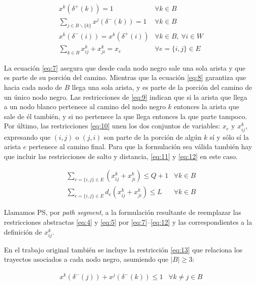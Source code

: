 \documentclass[10pt, a4paper]{article}
\theoremstyle{definition}
\begin{document}
\begin{align} 
	& x^{k}\left(\delta^{+}(k)\right)=1 & \forall k \in B \label{eq:7} \\
	& \sum_{j \in B \backslash\{k\}} x^{j}\left(\delta^{-}(k)\right)=1 & \forall k \in B \label{eq:8} \\
	& x^{k}\left(\delta^{-}(i)\right)=x^{k}\left(\delta^{+}(i)\right) & \forall k \in B,\ \forall i \in W \label{eq:9} \\
	& \sum_{k \in B} x_{i j}^{k}+x_{j i}^{k}=x_{e} & \forall e=\{i, j\} \in E \label{eq:10}
\end{align}

La ecuación \ref{eq:7} asegura que desde cada nodo negro sale una sola arista y que es parte de su porción del camino. Mientras que la ecuación \ref{eq:8} garantiza que hacia cada nodo de $B$ llega una sola arista, y es parte de la porción del camino de un único nodo negro. Las restricciones de \ref{eq:9} indican que si la arista que llega a un nodo blanco pertenece al camino del nodo negro $k$ entonces la arista que sale de él también, y si no pertenece la que llega entonces la que parte tampoco. Por último, las restricciones \ref{eq:10} unen los dos conjuntos de variables: $x_{e}$ y $x_{i j}^{k}$, expresando que $(i,j)$ o $(j,i)$ son parte de la porción de algún $k$ sí y sólo sí la arista $e$ pertenece al camino final. Para que la formulación sea válida también hay que incluir las restricciones de salto y distancia, \ref{eq:11} y \ref{eq:12} en este caso.

\begin{align} 
	& \sum_{e=\{i, j\} \in E}\left(x_{i j}^{k}+x_{j i}^{k}\right) \leq Q+1 & \forall k \in B \label{eq:11} \\
	& \sum_{e=\{i, j\} \in E} d_{e}\left(x_{i j}^{k}+x_{j i}^{k}\right) \leq L & \forall k \in B \label{eq:12}
\end{align}

Llamamos PS, por \textit{path segment}, a la formulación resultante de reemplazar las restricciones abstractas \ref{eq:4} y \ref{eq:5} por \ref{eq:7}–\ref{eq:12} y las correspondientes a la definición de $x_{i j}^{k}$.

En el trabajo original también se incluye la restricción \ref{eq:13} que relaciona los trayectos asociados a cada nodo negro, asumiendo que $|B| \geq 3$:

\begin{align}
	& x^{k}\left(\delta^{-}(j)\right)+x^{j}\left(\delta^{-}(k)\right) \leq 1 & \forall k \neq j \in B \label{eq:13}
\end{align}
\end{document}
